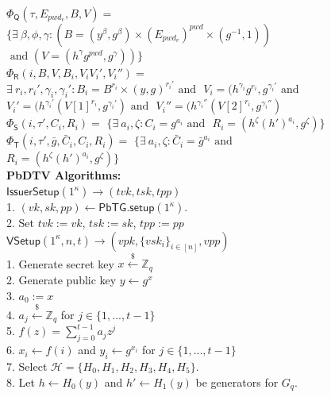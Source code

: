 \documentclass[conference]{IEEEtran}
\newcommand{\cH}{\mathcal{H}}
\newcommand{\cQ}{\mathsf{Q}}
\newcommand{\cR}{\mathsf{R}}
\newcommand{\cS}{\mathsf{S}}
\newcommand{\cT}{\mathsf{T}}
\newcommand{\secparameter}{\kappa}
\newcommand{\pwd}{pwd}
\newcommand{\sk}{sk}
\newcommand{\vk}{vk}
\newcommand{\pp}{pp}
\newcommand{\tvk}{tvk}
\newcommand{\tsk}{tsk}
\newcommand{\tpp}{tpp}
\newcommand{\vpk}{vpk}
\newcommand{\vsk}{vsk}
\newcommand{\vpp}{vpp}
\begin{document}
\begin{figure}
\begin{multicols}{2}
\raggedright
\scriptsize

\\

\noindent $\Phi_{\cQ}(\tau, E_{\pwd_{v}}, B, V) =$ $\{\exists~\beta, \phi, \gamma : (B = (y^{\beta}, g^{\beta}) \times (E_{\pwd_{v}})^{\pwd} \times (g^{-1}, 1))$ 
$\text{ and } (V = (h^{\gamma}g^{\pwd}, g^{\gamma}))\}$\\

\noindent $\Phi_{\cR}(i, B, V, B_{i}, V_{i} V_{i}', V_{i}'') =$ $\exists~ r_i, r_i', \gamma_i, \gamma_i' : B_i = B^{r_i} \times (y, g)^{r_i'} \text{ and }$ 
$V_i = (h^{\gamma_i}g^{r_i}, g^{\gamma_i'} \text{ and }$  
$V_i' = (h^{\gamma_i'}(V[1]^{r_i}, g^{\gamma_i'}) \text{ and }$ 
$V_i'' = (h^{\gamma_i''}(V[2]^{r_i},g^{\gamma_i''})$\\

\noindent $\Phi_{\cS}(i, \tau', C_i, R_i) =$ $\{\exists~ a_i, \zeta : C_i =g^{a_i} \text{ and }$ $R_i = (h^{\zeta}(h')^{a_i}, g^{\zeta})\}$\\

\noindent $\Phi_{\cT}(i, \tau', \bar{g}, \bar{C}_i, C_i, R_i) =$ $\{\exists~ a_i, \zeta : \bar{C}_i =\bar{g}^{a_i} \text{ and }$ $R_i = (h^{\zeta}(h')^{a_i}, g^{\zeta})\}$\\
{\bf PbDTV Algorithms:}\\
\noindent\underline{$\mathsf{IssuerSetup}(1^{\secparameter}) \rightarrow (\tvk,\tsk, \tpp)$}\\
1. $(\vk,\sk,\pp) \leftarrow \mathsf{PbTG}.\mathsf{setup}(1^{\secparameter})$.\\
2. Set $\tvk := \vk$, $\tsk := \sk$, $\tpp := \pp$\\

\noindent\underline{$\mathsf{VSetup}(1^{\secparameter}, n, t) \rightarrow (\vpk,\{\vsk_{i}\}_{i \in [n]}, \vpp)$}\\
1. Generate secret key $x \xleftarrow{\$} \mathbb{Z}_q$\\
2. Generate public key $y \leftarrow g^{x}$\\
3. $a_0 := x$\\
4. $a_j \xleftarrow{\$} \mathbb{Z}_q$ for $j \in \{1,...,t-1\}$\\
5. $f(z) = \sum^{t-1}_{j=0} a_j z^j$\\
6. $x_i \leftarrow f(i)$ and $y_i \leftarrow g^{x_i}$ for $j \in \{1,...,t-1\}$\\
7. Select $\cH = \{H_0,H_1,H_2,H_3,H_4,H_5\}$.\\
8. Let $h \leftarrow H_0(y)$ and $h' \leftarrow H_1(y)$ be generators for $G_q$.\\


\end{multicols}
\end{figure}
\end{document}
